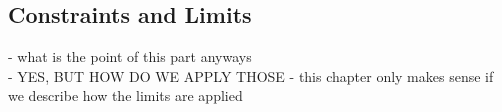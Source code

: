 \documentclass[]{article}
\begin{document}





\subsection{Constraints and Limits}

\alert{
	- what is the point of this part anyways \\
	- YES, BUT HOW DO WE APPLY THOSE - this chapter only makes sense if we describe how the limits are applied \\
}


%
%
%
\end{document}
